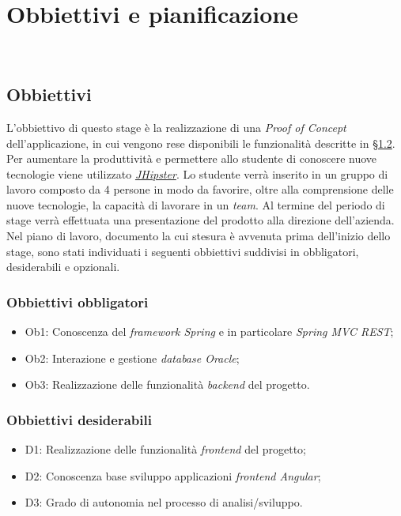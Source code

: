 
\chapter{Obbiettivi e pianificazione}
\label{cap:obbiettivi-pianificazione}

\\

\section{Obbiettivi}
L'obbiettivo di questo stage è la realizzazione di una \textit{Proof of Concept} dell'applicazione, in cui vengono rese disponibili le funzionalità descritte in \hyperref[sez:scopo]{§1.2}. Per aumentare la produttività e permettere allo studente di conoscere nuove tecnologie viene utilizzato \textit{\hyperref[jhi]{JHipster}}. Lo studente verrà inserito in un gruppo di lavoro composto da 4 persone in modo da favorire, oltre alla comprensione delle nuove tecnologie, la capacità di lavorare in un \textit{team}.
Al termine del periodo di stage verrà effettuata una presentazione del prodotto alla direzione dell'azienda.
\\Nel piano di lavoro, documento la cui stesura è avvenuta prima dell'inizio dello stage, sono stati individuati i seguenti obbiettivi suddivisi in obbligatori, desiderabili e opzionali.
\subsection{Obbiettivi obbligatori}
\begin{itemize}
    \item Ob1: Conoscenza del \textit{framework Spring} e in particolare \textit{Spring MVC REST};
    \item Ob2: Interazione e gestione \textit{database Oracle};
    \item Ob3: Realizzazione delle funzionalità \textit{backend} del progetto.
\end{itemize}
\subsection{Obbiettivi desiderabili}
\begin{itemize}
    \item D1: Realizzazione delle funzionalità \textit{frontend} del progetto;
    \item D2: Conoscenza base sviluppo applicazioni \textit{frontend Angular};
    \item D3: Grado di autonomia nel processo di analisi/sviluppo.
\end{itemize}
